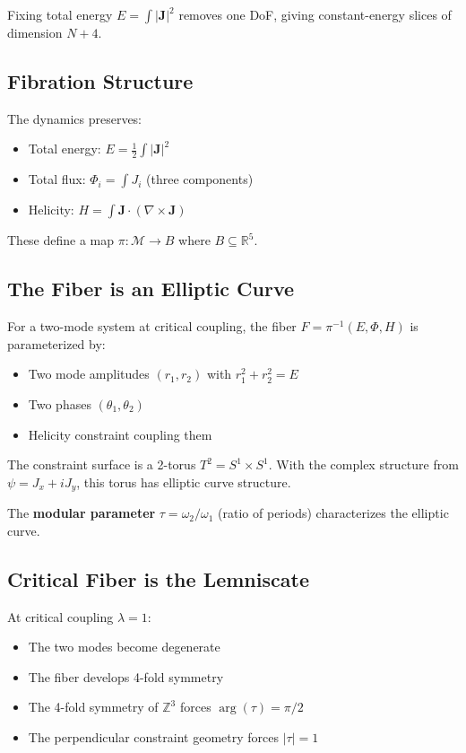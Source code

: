 \documentclass[11pt,a4paper]{article}
\theoremstyle{definition}
\theoremstyle{remark}
\newcommand{\Zthree}{\mathbb{Z}^3}
\begin{document}
Fixing total energy $E = \int |\mathbf{J}|^2$ removes one DoF, giving constant-energy slices of dimension $N + 4$.

\subsection*{Fibration Structure}

The dynamics preserves:
\begin{itemize}
    \item Total energy: $E = \frac{1}{2}\int|\mathbf{J}|^2$
    \item Total flux: $\Phi_i = \int J_i$ (three components)
    \item Helicity: $H = \int \mathbf{J} \cdot (\nabla \times \mathbf{J})$
\end{itemize}

These define a map $\pi: \mathcal{M} \to B$ where $B \subseteq \mathbb{R}^5$.

\subsection*{The Fiber is an Elliptic Curve}

For a two-mode system at critical coupling, the fiber $F = \pi^{-1}(E, \Phi, H)$ is parameterized by:
\begin{itemize}
    \item Two mode amplitudes $(r_1, r_2)$ with $r_1^2 + r_2^2 = E$
    \item Two phases $(\theta_1, \theta_2)$
    \item Helicity constraint coupling them
\end{itemize}

The constraint surface is a 2-torus $T^2 = S^1 \times S^1$. With the complex structure from $\psi = J_x + iJ_y$, this torus has elliptic curve structure.

The \textbf{modular parameter} $\tau = \omega_2/\omega_1$ (ratio of periods) characterizes the elliptic curve.

\subsection*{Critical Fiber is the Lemniscate}

At critical coupling $\lambda = 1$:
\begin{itemize}
    \item The two modes become degenerate
    \item The fiber develops 4-fold symmetry
    \item The 4-fold symmetry of $\Zthree$ forces $\arg(\tau) = \pi/2$
    \item The perpendicular constraint geometry forces $|\tau| = 1$
\end{itemize}
\end{document}
